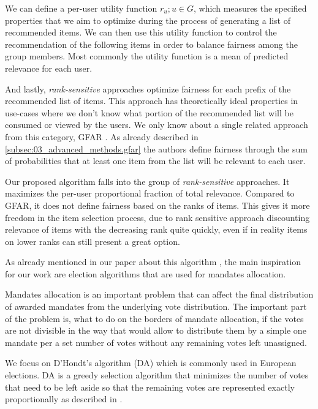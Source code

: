We can define a per-user utility function $r_u; u \in G$, which measures the specified properties that we aim to optimize during the process of generating a list of recommended items. We can then use this utility function to control the recommendation of the following items in order to balance fairness among the group members. Most commonly the utility function is a mean of predicted relevance for each user. %

And lastly, \textit{rank-sensitive} approaches optimize fairness for each prefix of the recommended list of items. This approach has theoretically ideal properties in use-cases where we don't know what portion of the recommended list will be consumed or viewed by the users. We only know about a single related approach from this category, GFAR \cite{GFAR-kaya2020}. As already described in \ref{subsec:03_advanced_methods.gfar} the authors define fairness through the sum of probabilities that at least one item from the list will be relevant to each user.

Our proposed algorithm falls into the group of \textit{rank-sensitive} approaches. It maximizes the per-user proportional fraction of total relevance. Compared to GFAR, it does not define fairness based on the ranks of items. This gives it more freedom in the item selection process, due to rank sensitive approach discounting relevance of items with the decreasing rank quite quickly, even if in reality items on lower ranks can still present a great option.

As already mentioned in our paper about this algorithm \cite{our_ep_fuzz_da}, the main inspiration for our work are election algorithms that are used for mandates allocation.

Mandates allocation is an important problem that can affect the final distribution of awarded mandates from the underlying vote distribution. The important part of the problem is, what to do on the borders of mandate allocation, if the votes are not divisible in the way that would allow to distribute them by a simple one mandate per a set number of votes without any remaining votes left unassigned.

We focus on D'Hondt's algorithm (DA) which is commonly used in European elections. DA is a greedy selection algorithm that minimizes the number of votes that need to be left aside so that the remaining votes are represented exactly proportionally as described in \cite{wiki:dhondt_method}.

